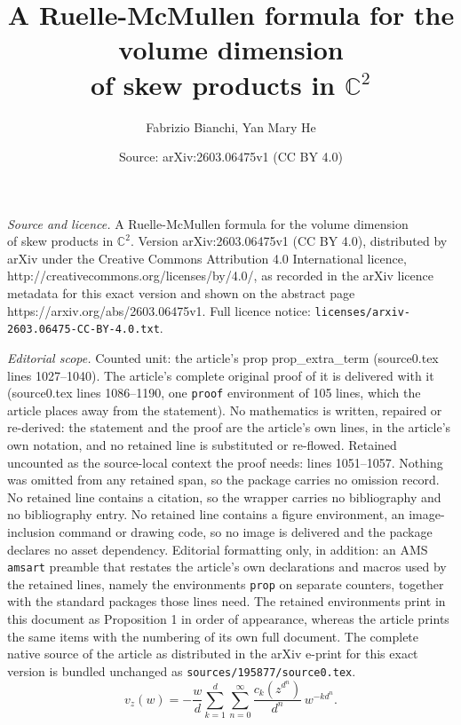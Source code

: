 \documentclass[10pt,a4paper]{amsart}
\title{A Ruelle-McMullen formula for the volume dimension\\ of skew products in $\mathbb C^2$}
\author{Fabrizio Bianchi, Yan Mary He}
\date{Source: arXiv:2603.06475v1 (CC BY 4.0)}
\begin{document}
\maketitle

\noindent\emph{Source and licence.} A Ruelle-McMullen formula for the volume dimension\\ of skew products in $\mathbb C^2$. Version arXiv:2603.06475v1 (CC BY 4.0), distributed by arXiv under the Creative Commons Attribution 4.0 International licence, http://creativecommons.org/licenses/by/4.0/, as recorded in the arXiv licence metadata for this exact version and shown on the abstract page https://arxiv.org/abs/2603.06475v1. Full licence notice: \texttt{licenses/arxiv-2603.06475-CC-BY-4.0.txt}.\par\smallskip

\noindent\textit{Editorial scope.} Counted unit: the article's prop prop\_extra\_term (source0.tex lines 1027--1040). The article's complete original proof of it is delivered with it (source0.tex lines 1086--1190, one \texttt{proof} environment of 105 lines, which the article places away from the statement). No mathematics is written, repaired or re-derived: the statement and the proof are the article's own lines, in the article's own notation, and no retained line is substituted or re-flowed.  Retained uncounted as the source-local context the proof needs: lines 1051--1057.  Nothing was omitted from any retained span, so the package carries no omission record.  No retained line contains a citation, so the wrapper carries no bibliography and no bibliography entry.  No retained line contains a figure environment, an image-inclusion command or drawing code, so no image is delivered and the package declares no asset dependency.  Editorial formatting only, in addition: an AMS \texttt{amsart} preamble that restates the article's own declarations and macros used by the retained lines, namely the environments \texttt{prop} on separate counters, together with the standard packages those lines need.  The retained environments print in this document as Proposition 1 in order of appearance, whereas the article prints the same items with the numbering of its own full document.  The complete native source of the article as distributed in the arXiv e-print for this exact version is bundled unchanged as \texttt{sources/195877/source0.tex}.
\begin{equation}\label{eq_v_outside}
v_z(w)
=
-\frac{w}{d}
\sum_{k=1}^d\sum_{n=0}^{\infty}
\frac{c_k(z^{d^n})}{d^n}\,w^{-k d^n}.
\end{equation}
\end{document}
